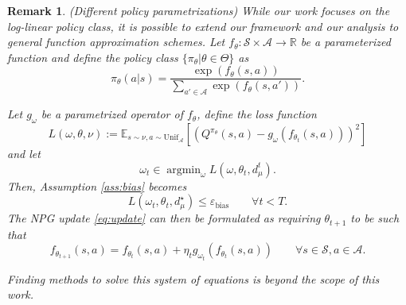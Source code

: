 \documentclass[a4paper,12pt]{article}
\newtheorem{remark}[theorem]{Remark}
\numberwithin{theorem}{section}
\newcommand\E{\mathbb{E}}
\newcommand\A{\mathcal{A}}
\newcommand\R{\mathbb{R}}
\renewcommand\S{\mathcal{S}}
\newcommand\1{\mathbf{1}}
\newcommand{\argmin}{\mathop{\mathrm{argmin}}}
\begin{document}
\begin{remark} (Different policy parametrizations)
	\label{remark:1}
	While our work focuses on the log-linear policy class, it is possible to extend our framework and our analysis to general function approximation schemes. Let  $f_\theta:\S\times\A\rightarrow\R$ be a parameterized function and define the policy class $\{\pi_\theta|\theta\in\Theta\}$ as
	\[\pi_\theta(a|s) = \frac{\exp(f_\theta(s,a))}{\sum_{a'\in\A}\exp(f_\theta(s,a'))}.\]

	Let $g_\omega$ be a parametrized operator of $f_\theta$, define the loss function
	\[L(\omega,\theta,\nu) := \E_{s\sim \nu, a\sim \text{Unif}_\A}\left[\left(Q^{\pi_\theta} (s,a)- g_\omega(f_{\theta_t}(s,a))\right)^2\right]\]
	and let
	\[\omega_t\in\argmin_\omega L(\omega,\theta_t,d^t_\mu).\]
	Then, Assumption \ref{ass:bias} becomes \[L(\omega_t,\theta_t,d^\star_\mu)\leq\varepsilon_\text{bias}\qquad \forall t < T.\]
	The NPG update \eqref{eq:update} can then be formulated as requiring $\theta_{t + 1}$ to be such that \[f_{\theta_{t + 1}}(s,a) = f_{\theta_t}(s,a) + \eta_tg_{\omega_t}(f_{\theta_t}(s,a)) \qquad \forall s\in\S,a\in\A.\]

	Finding methods to solve this system of equations is beyond the scope of this work.
\end{remark}
\end{document}
